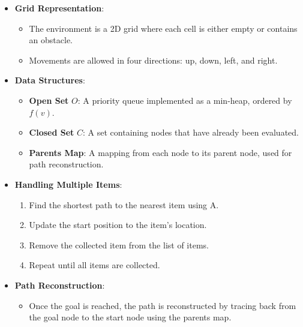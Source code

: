 \documentclass[12pt]{article}
\begin{document}
\begin{itemize}
    \item \textbf{Grid Representation}:
    \begin{itemize}
        \item The environment is a 2D grid where each cell is either empty or contains an obstacle.
        \item Movements are allowed in four directions: up, down, left, and right.
    \end{itemize}
    \item \textbf{Data Structures}:
    \begin{itemize}
        \item \textbf{Open Set} \( O \): A priority queue implemented as a min-heap, ordered by \( f(v) \).
        \item \textbf{Closed Set} \( C \): A set containing nodes that have already been evaluated.
        \item \textbf{Parents Map}: A mapping from each node to its parent node, used for path reconstruction.
    \end{itemize}
    \item \textbf{Handling Multiple Items}:
    \begin{enumerate}
        \item Find the shortest path to the nearest item using A\*.
        \item Update the start position to the item's location.
        \item Remove the collected item from the list of items.
        \item Repeat until all items are collected.
    \end{enumerate}
    \item \textbf{Path Reconstruction}:
    \begin{itemize}
        \item Once the goal is reached, the path is reconstructed by tracing back from the goal node to the start node using the parents map.
    \end{itemize}
\end{itemize}
\end{document}
